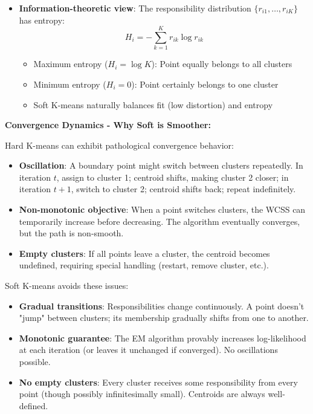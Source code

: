 \documentclass[12pt]{article}
\begin{document}
\begin{explanation}
\begin{itemize}
    \item \textbf{Information-theoretic view}: The responsibility distribution $\{r_{i1}, \ldots, r_{iK}\}$ has entropy:
    \[
    H_i = -\sum_{k=1}^K r_{ik} \log r_{ik}
    \]
    \begin{itemize}
        \item Maximum entropy ($H_i = \log K$): Point equally belongs to all clusters
        \item Minimum entropy ($H_i = 0$): Point certainly belongs to one cluster
        \item Soft K-means naturally balances fit (low distortion) and entropy
    \end{itemize}
\end{itemize}

\textbf{Convergence Dynamics - Why Soft is Smoother:}

Hard K-means can exhibit pathological convergence behavior:

\begin{itemize}
    \item \textbf{Oscillation}: A boundary point might switch between clusters repeatedly. In iteration $t$, assign to cluster 1; centroid shifts, making cluster 2 closer; in iteration $t+1$, switch to cluster 2; centroid shifts back; repeat indefinitely.

    \item \textbf{Non-monotonic objective}: When a point switches clusters, the WCSS can temporarily increase before decreasing. The algorithm eventually converges, but the path is non-smooth.

    \item \textbf{Empty clusters}: If all points leave a cluster, the centroid becomes undefined, requiring special handling (restart, remove cluster, etc.).
\end{itemize}

Soft K-means avoids these issues:

\begin{itemize}
    \item \textbf{Gradual transitions}: Responsibilities change continuously. A point doesn't "jump" between clusters; its membership gradually shifts from one to another.

    \item \textbf{Monotonic guarantee}: The EM algorithm provably increases log-likelihood at each iteration (or leaves it unchanged if converged). No oscillations possible.

    \item \textbf{No empty clusters}: Every cluster receives some responsibility from every point (though possibly infinitesimally small). Centroids are always well-defined.
\end{itemize}


\end{explanation}
\end{document}
